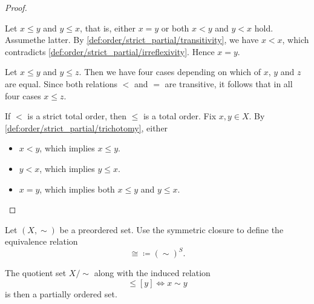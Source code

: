 \begin{proof}
\begin{description}
     Let \( x \leq y \) and \( y \leq x \), that is, either \( x = y \) or both \( x < y \) and \( y < x \) hold. Assume\LEM the latter. By \ref{def:order/strict_partial/transitivity}, we have \( x < x \), which contradicts \ref{def:order/strict_partial/irreflexivity}. Hence \( x = y \).

     Let \( x \leq y \) and \( y \leq z \). Then we have four cases depending on which of \( x \), \( y \) and \( z \) are equal. Since both relations \( < \) and \( = \) are transitive, it follows that in all four cases \( x \leq z \).

     If \( < \) is a strict total order, then \( \leq \) is a total order. Fix \( x, y \in X \). By \ref{def:order/strict_partial/trichotomy}, either
    \begin{itemize}
      \item \( x < y \), which implies \( x \leq y \).
      \item \( y < x \), which implies \( y \leq x \).
      \item \( x = y \), which implies both \( x \leq y \) and \( y \leq x \).
    \end{itemize}
  \end{description}
\end{proof}

\begin{proposition}\label{thm:preorder_to_partial_order}
  Let \( (X, \sim) \) be a preordered set. Use the symmetric closure to define the equivalence relation
  \begin{equation*}
    \cong \coloneqq (\sim)^S.
  \end{equation*}

  The quotient set \( X / \sim \) along with the induced relation
  \begin{equation*}
    [x] \leq [y] \iff x \sim y
  \end{equation*}
  is then a partially ordered set.
\end{proposition}
